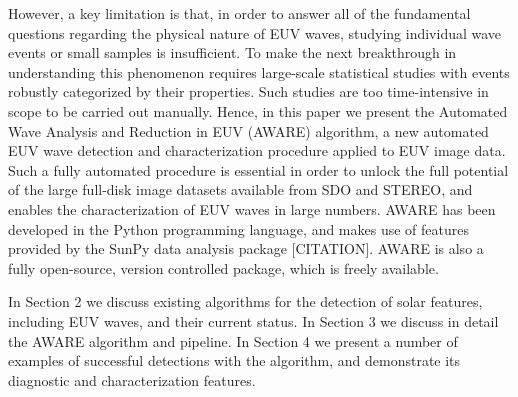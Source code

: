 However, a key limitation is that, in order to answer all of the fundamental questions regarding the
physical nature of EUV waves, studying individual wave events or small
samples is insufficient. To make the next breakthrough in
understanding this phenomenon requires large-scale statistical studies
with events robustly categorized by their properties. Such studies are too time-intensive in scope to be carried out manually. Hence, in this paper we present the Automated Wave Analysis and Reduction in EUV (AWARE) algorithm, a new automated EUV wave
detection and characterization procedure applied to EUV image
data. Such a fully automated procedure is essential in order to unlock
the full potential of the large full-disk image datasets available from SDO and STEREO, and
enables the characterization of EUV waves in large numbers. AWARE has been developed in the Python programming language, and makes use of features provided by the SunPy data analysis package [CITATION]. AWARE is also a fully open-source, version controlled package, which is freely available.

In Section 2 we discuss existing algorithms for the detection of solar features, including EUV waves, and their current status. In Section 3 we discuss in detail the AWARE algorithm and pipeline. In Section 4 we present a number of examples of successful detections with the algorithm, and demonstrate its diagnostic and characterization features. 





